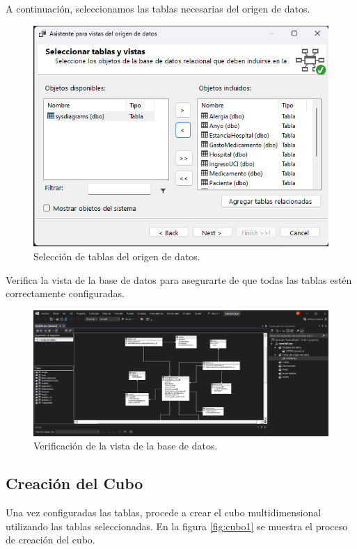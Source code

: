 \documentclass{article}
\begin{document}
A continuación, seleccionamos las tablas necesarias del origen de datos.

\begin{figure}[H]
	\begin{center} 
		\includegraphics[width=.7\textwidth]{images/vista_tablas.png}
		\caption{Selección de tablas del origen de datos.}
		\label{fig:origen2}
	\end{center}
\end{figure}

Verifica la vista de la base de datos para asegurarte de que todas las tablas estén correctamente configuradas.

\begin{figure}[H]
	\begin{center} 
		\includegraphics[width=.9\textwidth]{images/vista_imagen.png}
		\caption{Verificación de la vista de la base de datos.}
		\label{fig:origen3}
	\end{center}
\end{figure}

\subsection{Creación del Cubo}
Una vez configuradas las tablas, procede a crear el cubo multidimensional utilizando las tablas seleccionadas. En la figura \ref{fig:cubo1} se muestra el proceso de creación del cubo.
\end{document}
